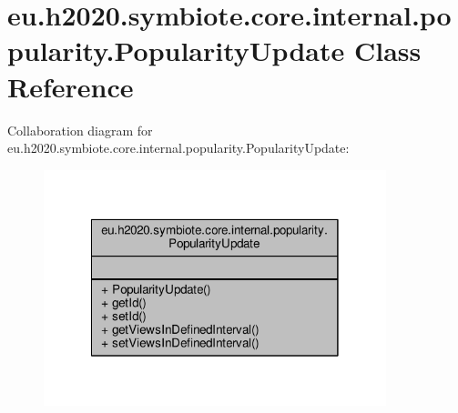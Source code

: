 \hypertarget{classeu_1_1h2020_1_1symbiote_1_1core_1_1internal_1_1popularity_1_1PopularityUpdate}{}\section{eu.\+h2020.\+symbiote.\+core.\+internal.\+popularity.\+Popularity\+Update Class Reference}
\label{classeu_1_1h2020_1_1symbiote_1_1core_1_1internal_1_1popularity_1_1PopularityUpdate}


Collaboration diagram for eu.\+h2020.\+symbiote.\+core.\+internal.\+popularity.\+Popularity\+Update\+:
\nopagebreak
\begin{figure}[H]
\begin{center}
\leavevmode
\includegraphics[width=282pt]{classeu_1_1h2020_1_1symbiote_1_1core_1_1internal_1_1popularity_1_1PopularityUpdate__coll__graph}
\end{center}
\end{figure}
